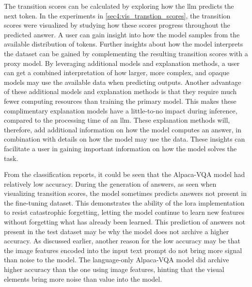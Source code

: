 The transition scores can be calculated by exploring how the \gls{llm} predicts the next token. In the experiments in \autoref{sec4:vis_transtion_scores}, the transition scores were visualized by studying how these scores progress throughout the predicted answer. A user can gain insight into how the model samples from the available distribution of tokens. Further insights about how the model interprets the dataset can be gained by complementing the resulting transition scores with a proxy model. %
By leveraging additional models and explanation methods, a user can get a combined interpretation of how larger, more complex, and opaque models may use the available data when predicting outputs.
Another advantage of these additional models and explanation methods is that they require much fewer computing resources than training the primary model. 
This makes these complimentary explanation models have a little-to-no impact during inference, compared to the processing time of an \gls{llm}. 
These explanation methods will, therefore, add additional information on how the model computes an answer, in combination with details on how the model may use the data. These insights can facilitate a user in gaining important information on how the model solves the task.

From the classification reports, it could be seen that the Alpaca-VQA model had relatively low accuracy. During the generation of answers, as seen when visualizing transition scores, the model sometimes predicts answers not present in the fine-tuning dataset. This demonstrates the ability of the \gls{lora} implementation to resist catastrophic forgetting, letting the model continue to learn new features without forgetting what has already been learned. 
This prediction of answers not present in the test dataset may be why the model does not archive a higher accuracy. As discussed earlier, another reason for the low accuracy may be that the image features encoded into the input text prompt do not bring more signal than noise to the model. The language-only Alpaca-VQA model did archive higher accuracy than the one using image features, hinting that the visual elements bring more noise than value into the model. 


